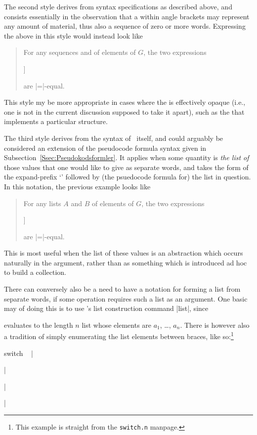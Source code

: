 \documentclass{mtmtcl}
\theoremstyle{plain}
\theoremstyle{remark}
\begin{document}
The second style derives from syntax specifications as described 
above, and consists essentially in the observation that a 
 within angle brackets may represent any amount of 
material, thus also a sequence of zero or more words. Expressing the 
above in this style would instead look like
\begin{quote}
  For any sequences  and  of elements of $G$, the 
  two expressions
  \begin{displaysyntax}
    \par
    [$G$ * [$G$ * \meta{A}] [$G$ * \meta{B}]]
  \end{displaysyntax}
  are |=|-equal.
\end{quote}
This style my be more appropriate in cases where the  is 
effectively opaque (i.e., one is not in the current discussion 
supposed to take it apart), such as the  that implements 
a particular structure.

The third style derives from the syntax of \Tcl\ itself, and could 
arguably be considered an extension of the pseudocode formula syntax 
given in Subsection~\ref{Ssec:Pseudokodsformler}. It applies when 
some quantity is \emph{the list of} those values that one would like 
to give as separate words, and takes the form of the expand-prefix 
`\splode' followed by (the psuedocode formula for) the list in 
question. In this notation, the previous example looks like
\begin{quote}
  For any lists $A$ and $B$ of elements of $G$, the two expressions
  \begin{displaysyntax}
    \par
    [$G$ * [$G$ * \splode$A$] [$G$ * \splode$B$]]
  \end{displaysyntax}
  are |=|-equal.
\end{quote}
This is most useful when the list of these values is an 
abstraction which occurs naturally in the argument, rather than 
as something which is introduced ad hoc to build a collection.

There can conversely also be a need to have a notation for forming a 
list from separate words, if some operation requires such a list as an 
argument. One basic may of doing this is to use \Tcl's list 
construction command |list|, since
\begin{displaysyntax}
\end{displaysyntax}
evaluates to the length $n$ list whose elements are $a_1$, \dots, 
$a_n$. There is however also a tradition of simply enumerating the 
list elements between braces, like so:\footnote{
  This example is straight from the \texttt{switch.n} manpage.
}
\begin{displaysyntax}
  switch \regopt\ 
  |{|\begin{regblock}[\regplus]   
  \end{regblock}|}|
\end{displaysyntax}
\end{document}

